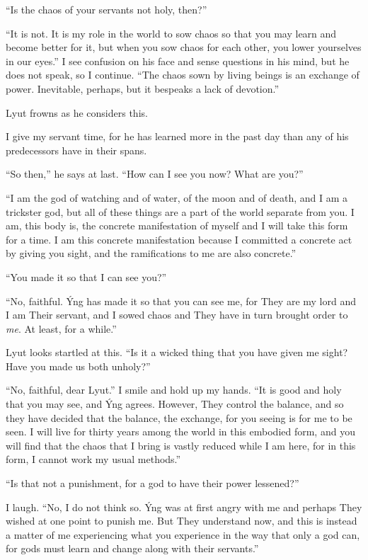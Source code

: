 ``Is the chaos of your servants not holy, then?''

``It is not. It is my role in the world to sow chaos so that you may learn and become better for it, but when you sow chaos for each other, you lower yourselves in our eyes.'' I see confusion on his face and sense questions in his mind, but he does not speak, so I continue. ``The chaos sown by living beings is an exchange of power. Inevitable, perhaps, but it bespeaks a lack of devotion.''

Lyut frowns as he considers this.

I give my servant time, for he has learned more in the past day than any of his predecessors have in their spans.

``So then,'' he says at last. ``How can I see you now? What are you?''

``I am the god of watching and of water, of the moon and of death, and I am a trickster god, but all of these things are a part of the world separate from you. I am, this body is, the concrete manifestation of myself and I will take this form for a time. I am this concrete manifestation because I committed a concrete act by giving you sight, and the ramifications to me are also concrete.''

``You made it so that I can see you?''

``No, faithful. Ýng has made it so that you can see me, for They are my lord and I am Their servant, and I sowed chaos and They have in turn brought order to \emph{me}. At least, for a while.''

Lyut looks startled at this. ``Is it a wicked thing that you have given me sight? Have you made us both unholy?''

``No, faithful, dear Lyut.'' I smile and hold up my hands. ``It is good and holy that you may see, and Ýng agrees. However, They control the balance, and so they have decided that the balance, the exchange, for you seeing is for me to be seen. I will live for thirty years among the world in this embodied form, and you will find that the chaos that I bring is vastly reduced while I am here, for in this form, I cannot work my usual methods.''

``Is that not a punishment, for a god to have their power lessened?''

I laugh. ``No, I do not think so. Ýng was at first angry with me and perhaps They wished at one point to punish me. But They understand now, and this is instead a matter of me experiencing what you experience in the way that only a god can, for gods must learn and change along with their servants.''

